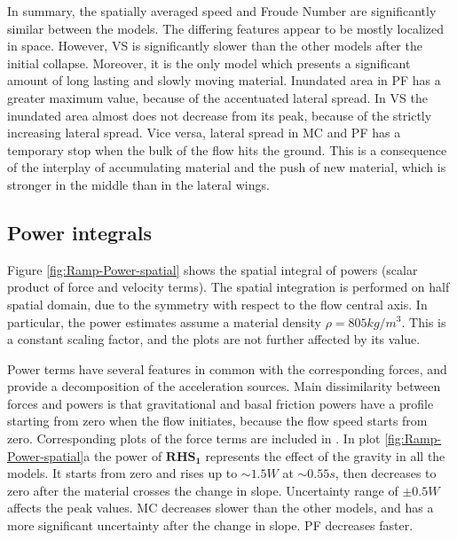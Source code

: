 \documentclass{article}
\begin{document}
In summary, the spatially averaged speed and Froude Number are significantly similar between the models. The differing features appear to be mostly localized in space. However, VS is significantly slower than the other models after the initial collapse. Moreover, it is the only model which presents a significant amount of long lasting and slowly moving material. Inundated area in PF has a greater maximum value, because of the accentuated lateral spread. In VS the inundated area almost does not decrease from its peak, because of the strictly increasing lateral spread. Vice versa, lateral spread in MC and PF has a temporary stop when the bulk of the flow hits the ground. This is a consequence of the interplay of accumulating material and the push of new material, which is stronger in the middle than in the lateral wings.

\subsection{Power integrals}
Figure \ref{fig:Ramp-Power-spatial} shows the spatial integral of powers (scalar product of force and velocity terms). The spatial integration is performed on half spatial domain, due to the symmetry with respect to the flow central axis. In particular, the power estimates assume a material density $\rho = 805 kg/m^3$. This is a constant scaling factor, and the plots are not further affected by its value.

Power terms have several features in common with the corresponding forces, and provide a decomposition of the acceleration sources. Main dissimilarity between forces and powers is that gravitational and basal friction powers have a profile starting from zero when the flow initiates, because the flow speed starts from zero. Corresponding plots of the force terms are included in \cite{Patra2018}. In plot \ref{fig:Ramp-Power-spatial}a the power of $\boldsymbol{RHS_1}$ represents the effect of the gravity in all the models. It starts from zero and rises up to $\sim 1.5 W$ at $\sim 0.55 s$, then decreases to zero after the material crosses the change in slope. Uncertainty range of $\pm 0.5 W$ affects the peak values. MC decreases slower than the other models, and has a more significant uncertainty after the change in slope. PF decreases faster.
\end{document}
